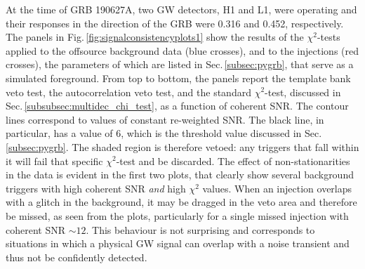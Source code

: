 \documentclass[binding=0.6cm, LaM]{sapthesis}
\begin{document}
	At the time of GRB 190627A, two GW detectors, H1 and L1, 
	were operating and their responses in the direction of the GRB were 0.316 and 0.452, respectively.
	The panels in Fig.\,\ref{fig:signalconsistencyplots1} show the results 
	of the $\chi^2$-tests applied to the offsource background data (blue crosses), and to the injections (red crosses),
	the parameters of which are listed in Sec.\,\ref{subsec:pygrb}, that serve as a simulated foreground. 
	From top to bottom, the panels report the template bank veto test, 
	the autocorrelation veto test, and the standard $\chi^2$-test, 
	discussed in Sec.\,\ref{subsubsec:multidec_chi_test}, as a function of coherent SNR. 
	The contour lines correspond to values of constant re-weighted SNR.
	The black line, in particular, has a value of 6, 
	which is the threshold value discussed in Sec.\,\ref{subsec:pygrb}.
	The shaded region is therefore vetoed: any triggers that fall within it 
	will fail that specific $\chi^2$-test and be discarded.
	The effect of non-stationarities in the data is evident in the first two plots, 
	that clearly show several background triggers with high coherent SNR \emph{and} high $\chi^2$ values.
	When an injection overlaps with a glitch in the background, 
	it may be dragged in the veto area and therefore be missed, as seen from the plots, 	
	particularly for a single missed injection with coherent SNR $\sim 12$.
	This behaviour is not surprising and corresponds to situations in which a physical GW signal 
	can overlap with a noise transient and thus not be confidently detected.
\end{document}
